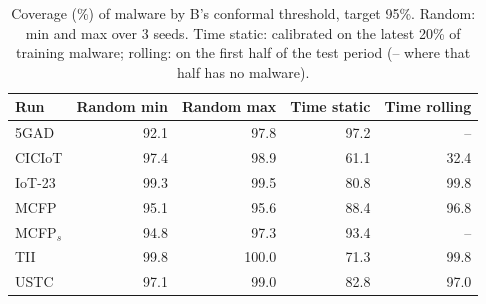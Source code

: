 \begin{table}[t]
\centering
\caption{Coverage (\%) of malware by B's conformal threshold, target 95\%. Random: min and max over 3 seeds. Time static: calibrated on the latest 20\% of training malware; rolling: on the first half of the test period (-- where that half has no malware).}
\label{tab:conformal}
\setlength{\tabcolsep}{4pt}
\begin{tabular}{lrrrr}
\toprule
Run & Random min & Random max & Time static & Time rolling \\
\midrule
5GAD & 92.1 & 97.8 & 97.2 & -- \\
CICIoT & 97.4 & 98.9 & 61.1 & 32.4 \\
IoT-23 & 99.3 & 99.5 & 80.8 & 99.8 \\
MCFP & 95.1 & 95.6 & 88.4 & 96.8 \\
MCFP$_{s}$ & 94.8 & 97.3 & 93.4 & -- \\
TII & 99.8 & 100.0 & 71.3 & 99.8 \\
USTC & 97.1 & 99.0 & 82.8 & 97.0 \\
\bottomrule
\end{tabular}
\end{table}
